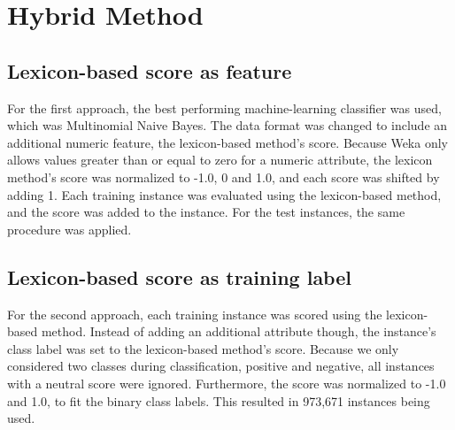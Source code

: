\section{Hybrid Method}

\subsection{Lexicon-based score as feature}
For the first approach, the best performing machine-learning classifier was used, which was Multinomial Naive Bayes. The data format was changed to include an additional numeric feature, the lexicon-based method's score. Because Weka only allows values greater than or equal to zero for a numeric attribute, the lexicon method's score was normalized to -1.0, 0 and 1.0, and each score was shifted by adding 1. Each training instance was evaluated using the lexicon-based method, and the score was added to the instance. For the test instances, the same procedure was applied.

\subsection{Lexicon-based score as training label}
For the second approach, each training instance was scored using the lexicon-based method. Instead of adding an additional attribute though, the instance's class label was set to the lexicon-based method's score. Because we only considered two classes during classification, positive and negative, all instances with a neutral score were ignored. Furthermore, the score was normalized to -1.0 and 1.0, to fit the binary class labels. This resulted in 973,671 instances being used.




